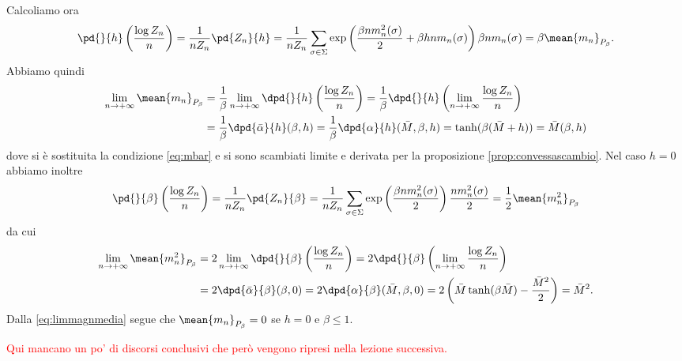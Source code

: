 Calcoliamo ora
\[ \pd{}{h}\left(\frac{\log Z_n}{n}\right) = \frac{1}{n Z_n} \pd{Z_n}{h} = \frac{1}{nZ_n}\sum_{\sigma \in \Sigma} \exp\left( \frac{\beta n m_n^2(\sigma)}{2} + \beta h n m_n(\sigma) \right) \beta n m_n(\sigma) = \beta \mean{m_n}_{P_\beta}. \]
Abbiamo quindi
\begin{align}
	\label{eq:limmagnmedia}
    \lim_{n \to +\infty}\mean{m_n}_{P_\beta} & = \frac{1}{\beta} \lim_{n \to +\infty} \dpd{}{h}\left(\frac{\log Z_n}{n}\right) = \frac{1}{\beta} \dpd{}{h} \left( \lim_{n \to +\infty} \frac{\log Z_n}{n} \right) \nonumber \\
	                                         & = \frac{1}{\beta} \dpd{\bar{\alpha}}{h}(\beta, h) = \frac{1}{\beta} \dpd{\alpha}{h} (\bar{M}, \beta, h) = \tanh(\beta(\bar{M}+h)) = \bar{M}(\beta, h)
\end{align}
dove si è sostituita la condizione \eqref{eq:mbar} e si sono scambiati limite e derivata per la proposizione \ref{prop:convessascambio}. Nel caso $ h = 0 $ abbiamo inoltre
\[ \pd{}{\beta} \left(\frac{\log Z_n}{n}\right) = \frac{1}{n Z_n} \pd{Z_n}{\beta} = \frac{1}{n Z_n} \sum_{\sigma \in \Sigma} \exp\left( \frac{\beta n m_n^2(\sigma)}{2} \right) \frac{n m_n^2(\sigma)}{2} = \frac{1}{2} \mean{m_n^2}_{P_\beta} \]
da cui
\begin{align*}
	\lim_{n \to +\infty}\mean{m_n^2}_{P_\beta} & = 2 \lim_{n \to +\infty} \dpd{}{\beta} \left(\frac{\log Z_n}{n}\right) = 2 \dpd{}{\beta} \left( \lim_{n \to +\infty}\frac{\log Z_n}{n} \right) \\
                                               & =	2 \dpd{\bar{\alpha}}{\beta}(\beta,0) = 2\dpd{\alpha}{\beta}(\bar{M},\beta,0) = 2\left( \bar{M}\tanh(\beta\bar{M}) - \frac{\bar{M}^2}{2} \right) = \bar{M}^2.
\end{align*}
Dalla \eqref{eq:limmagnmedia} segue che $ \mean{m_n}_{P_\beta} = 0 $ se $ h = 0 $ e $ \beta \leq 1 $.

\textcolor{red}{Qui mancano un po' di discorsi conclusivi che però vengono ripresi nella lezione successiva.}

